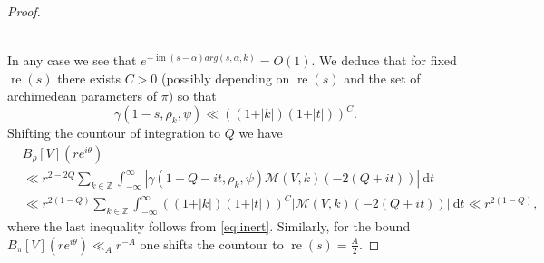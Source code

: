 \documentclass[10pt,a4paper]{amsart}
\newcommand{\Z}{\mathbb{Z}}
\newcommand{\imag}{\operatorname{im}}
\newcommand{\real}{\operatorname{re}}
\begin{document}
\begin{proof}
\begin{itemize}
\begin{align*}
        \end{align*}
         \end{itemize}
        In any case we see that $e^{-\imag(s-\alpha)arg(s,\alpha,k)} = O(1)$. We deduce that for fixed $\real(s)$ there exists $C>0$ (possibly depending on $\real(s)$ and the set of archimedean parameters of $\pi$) so that 
        \[\gamma(1-s,\rho_k,\psi) \ll \left((1+\vert{k}\vert)(1+\vert{t}\vert)\right)^C. \]
        Shifting the countour of integration to $Q$ we have 
        \begin{align*}
            &B_{\rho}[V](re^{i\theta}) \\ &\ll r^{2-2Q}\sum_{k\in \Z}\int_{-\infty}^{\infty}\left\vert{\gamma(1-Q-it,\rho_k,\psi) \mathcal{M}(V,k)(-2(Q+it))}\right\vert \ \mathrm{d}t \\ &\ll r^{2(1-Q)}\sum_{k\in\Z}\int_{-\infty}^{\infty}\left((1+\vert{k}\vert)(1+\vert{t}\vert)\right)^C\vert{\mathcal{M}(V,k)(-2(Q+it))}\vert \ \mathrm{d}t \ll r^{2(1-Q)},
        \end{align*}
        where the last inequality follows from \eqref{eq:inert}.
        Similarly, for the bound $B_{\pi}[V](re^{i\theta}) \ll_A r^{-A}$ one shifts the countour to $\real(s) = \frac{A}{2}$.  
       
    \end{proof}
\end{document}
